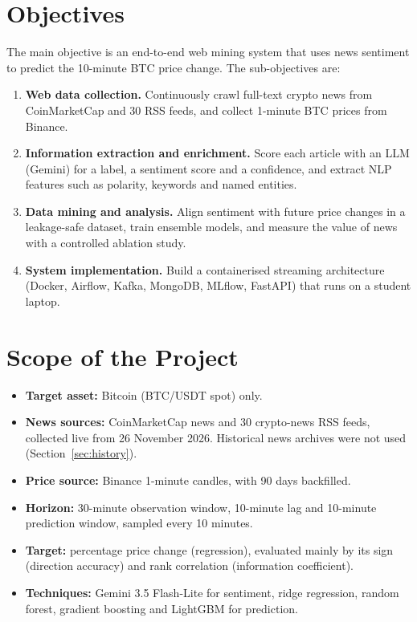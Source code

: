 \documentclass[12pt,a4paper,oneside]{report}
\begin{document}
\section{Objectives}
The main objective is an end-to-end web mining system that uses news
sentiment to predict the 10-minute BTC price change. The sub-objectives are:
\begin{enumerate}
  \item \textbf{Web data collection.} Continuously crawl full-text crypto
        news from CoinMarketCap and 30 RSS feeds, and collect 1-minute BTC
        prices from Binance.
  \item \textbf{Information extraction and enrichment.} Score each article
        with an LLM (Gemini) for a label, a sentiment score and a
        confidence, and extract NLP features such as polarity, keywords and
        named entities.
  \item \textbf{Data mining and analysis.} Align sentiment with future
        price changes in a leakage-safe dataset, train ensemble models, and
        measure the value of news with a controlled ablation study.
  \item \textbf{System implementation.} Build a containerised streaming
        architecture (Docker, Airflow, Kafka, MongoDB, MLflow, FastAPI)
        that runs on a student laptop.
\end{enumerate}

\section{Scope of the Project}
\begin{itemize}
  \item \textbf{Target asset:} Bitcoin (BTC/USDT spot) only.
  \item \textbf{News sources:} CoinMarketCap news and 30 crypto-news RSS
        feeds, collected live from 26 November 2026. Historical news
        archives were not used (Section~\ref{sec:history}).
  \item \textbf{Price source:} Binance 1-minute candles, with 90 days
        backfilled.
  \item \textbf{Horizon:} 30-minute observation window, 10-minute lag and
        10-minute prediction window, sampled every 10 minutes.
  \item \textbf{Target:} percentage price change (regression), evaluated
        mainly by its sign (direction accuracy) and rank correlation
        (information coefficient).
  \item \textbf{Techniques:} Gemini 3.5 Flash-Lite for sentiment, ridge
        regression, random forest, gradient boosting and LightGBM for
        prediction.
\end{itemize}
\end{document}
